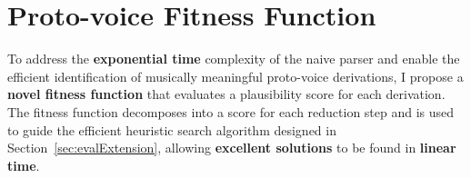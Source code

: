 \documentclass[12pt,a4paper,twoside,openany]{report} \usepackage[pdfborder={0 0 0}]{hyperref}    %
\DeclareMathOperator*{\argmax}{arg\,max} \DeclareMathOperator*{\argmin}{arg\,min}
\theoremstyle{definition} \newtheorem{definition}{Definition}[section]
\begin{document}
%
%
%
%
%

    \section{Proto-voice Fitness Function}
    \label{sec:extensionImplementation}

    To address the \textbf{exponential time} complexity of the naive parser and enable the efficient identification of musically
    meaningful proto-voice derivations, I propose a \textbf{novel fitness function} that evaluates a plausibility score
    for each
    derivation. The fitness function decomposes into a score for each reduction step and is used to guide the
    efficient heuristic search algorithm designed in Section~\ref{sec:evalExtension}, allowing \textbf{excellent
    solutions} to be found in \textbf{linear time}.
\end{document}
